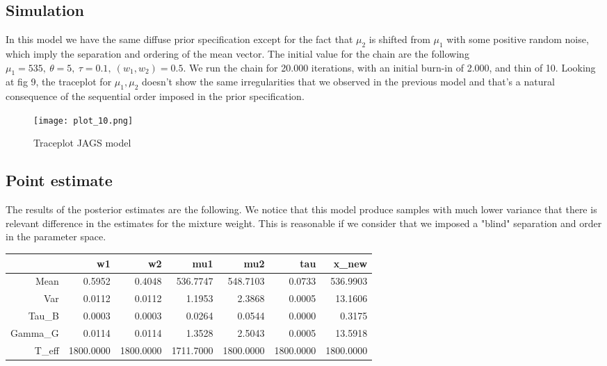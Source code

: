 \documentclass{article}
\begin{document}
\subsection{Simulation}
In this model we have the same diffuse prior specification except for the fact that $\mu_2$ is shifted from $\mu_1$ with some positive random noise, which imply the separation and ordering of the mean vector. The initial value for the chain are the following $\mu_1 = 535, \ \theta = 5, \ \tau = 0.1,\ (w_1, w_2) = 0.5$. We run the chain for 20.000 iterations, with an initial burn-in of 2.000, and thin of 10. Looking at fig 9, the traceplot for $\mu_1, \mu_2$ doesn't show the same irregularities that we observed in the previous model and that's a natural consequence of the sequential order imposed in the prior specification. 

\begin{figure}[h!]
    \centering
    \texttt{[image: plot\_10.png]}
    \caption{Traceplot JAGS model}
    \label{Monkey measurement}
\end{figure}

\subsection{Point estimate}
The results of the posterior estimates are the following. We notice that this model produce samples with much lower variance that there is relevant difference in the estimates for the mixture weight. This is reasonable if we consider that we imposed a "blind" separation and order in the parameter space.

\begin{table}[ht]
\centering
\begin{tabular}{rrrrrrr}
  \hline
 & w1 & w2 & mu1 & mu2 & tau & x\_new \\ 
  \hline
Mean & 0.5952 & 0.4048 & 536.7747 & 548.7103 & 0.0733 & 536.9903 \\ 
  Var & 0.0112 & 0.0112 & 1.1953 & 2.3868 & 0.0005 & 13.1606 \\ 
  Tau\_B & 0.0003 & 0.0003 & 0.0264 & 0.0544 & 0.0000 & 0.3175 \\ 
  Gamma\_G & 0.0114 & 0.0114 & 1.3528 & 2.5043 & 0.0005 & 13.5918 \\ 
  T\_eff & 1800.0000 & 1800.0000 & 1711.7000 & 1800.0000 & 1800.0000 & 1800.0000 \\ 
   \hline
\end{tabular}
\end{table}
\end{document}
